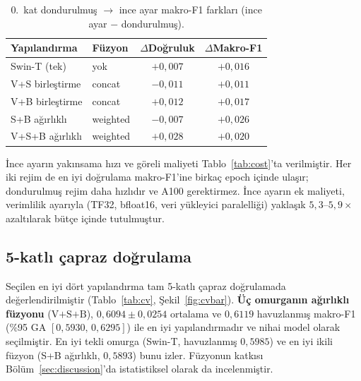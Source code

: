 \begin{table}[H]
  \centering
  \caption{0.~kat dondurulmuş $\to$ ince ayar makro-F1 farkları (ince ayar $-$
  dondurulmuş).}
  \label{tab:transfer}
  \begin{tabular}{llcc}
    \toprule
    Yapılandırma & Füzyon & $\Delta$Doğruluk & $\Delta$Makro-F1 \\
    \midrule
    Swin-T (tek)        & yok       & $+0{,}007$ & $+0{,}016$ \\
    V+S birleştirme     & concat    & $-0{,}011$ & $+0{,}011$ \\
    V+B birleştirme     & concat    & $+0{,}012$ & $+0{,}017$ \\
    S+B ağırlıklı       & weighted  & $-0{,}007$ & $+0{,}026$ \\
    V+S+B ağırlıklı     & weighted  & $+0{,}028$ & $+0{,}020$ \\
    \bottomrule
  \end{tabular}
\end{table}

İnce ayarın yakınsama hızı ve göreli maliyeti Tablo~\ref{tab:cost}'ta verilmiştir.
Her iki rejim de en iyi doğrulama makro-F1'ine birkaç epoch içinde ulaşır;
dondurulmuş rejim daha hızlıdır ve A100 gerektirmez. İnce ayarın ek maliyeti,
verimlilik ayarıyla (TF32, bfloat16, veri yükleyici paralelliği) yaklaşık
$5{,}3$--$5{,}9\times$ azaltılarak bütçe içinde tutulmuştur.

\begin{table}[H]
  \centering
  \caption{Transfer maliyeti: en iyi doğrulama epoch'u (yakınsama hızı) ve ayarlı
  A100 verim kazancı. Eğitim süresi loglanmadığından maliyet, yakınsama epoch'u ve
  göreli verimle ifade edilir.}
  \label{tab:cost}
\end{table}

\subsection{5-katlı çapraz doğrulama}
Seçilen en iyi dört yapılandırma tam 5-katlı çapraz doğrulamada
değerlendirilmiştir (Tablo~\ref{tab:cv}, Şekil~\ref{fig:cvbar}). \textbf{Üç
omurganın ağırlıklı füzyonu} ($\text{V+S+B}$), $0{,}6094 \pm 0{,}0254$ ortalama
ve $0{,}6119$ havuzlanmış makro-F1 (\%95 GA $[0{,}5930,\,0{,}6295]$) ile en iyi
yapılandırmadır ve nihai model olarak seçilmiştir. En iyi tekli omurga
(Swin-T, havuzlanmış $0{,}5985$) ve en iyi ikili füzyon (S+B ağırlıklı,
$0{,}5893$) bunu izler. Füzyonun katkısı Bölüm~\ref{sec:discussion}'da
istatistiksel olarak da incelenmiştir.

